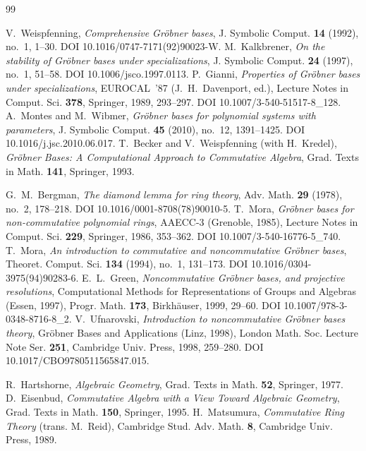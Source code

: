 \documentclass[11pt]{article}
\theoremstyle{definition}
\begin{document}
\begin{thebibliography}{99}

 V.~Weispfenning, \emph{Comprehensive Gr\"obner bases},
  J. Symbolic Comput. \textbf{14} (1992), no.~1, 1--30. DOI 10.1016/0747-7171(92)90023-W.
 M.~Kalkbrener, \emph{On the stability of Gr\"obner bases under specializations},
  J. Symbolic Comput. \textbf{24} (1997), no.~1, 51--58. DOI 10.1006/jsco.1997.0113.
 P.~Gianni, \emph{Properties of Gr\"obner bases under specializations},
  EUROCAL~'87 (J.~H.~Davenport, ed.), Lecture Notes in Comput. Sci. \textbf{378},
  Springer, 1989, 293--297. DOI 10.1007/3-540-51517-8\_128.
 A.~Montes and M.~Wibmer, \emph{Gr\"obner bases for polynomial systems with
  parameters}, J. Symbolic Comput. \textbf{45} (2010), no.~12, 1391--1425.
  DOI 10.1016/j.jsc.2010.06.017.
 T.~Becker and V.~Weispfenning (with H.~Kredel), \emph{Gr\"obner Bases:
  A Computational Approach to Commutative Algebra}, Grad. Texts in Math. \textbf{141},
  Springer, 1993.

 G.~M.~Bergman, \emph{The diamond lemma for ring theory},
  Adv. Math. \textbf{29} (1978), no.~2, 178--218. DOI 10.1016/0001-8708(78)90010-5.
 T.~Mora, \emph{Gr\"obner bases for non-commutative polynomial rings},
  AAECC-3 (Grenoble, 1985), Lecture Notes in Comput. Sci. \textbf{229}, Springer, 1986, 353--362.
  DOI 10.1007/3-540-16776-5\_740.
 T.~Mora, \emph{An introduction to commutative and noncommutative Gr\"obner bases},
  Theoret. Comput. Sci. \textbf{134} (1994), no.~1, 131--173. DOI 10.1016/0304-3975(94)90283-6.
 E.~L.~Green, \emph{Noncommutative Gr\"obner bases, and projective resolutions},
  Computational Methods for Representations of Groups and Algebras (Essen, 1997),
  Progr. Math. \textbf{173}, Birkh\"auser, 1999, 29--60. DOI 10.1007/978-3-0348-8716-8\_2.
 V.~Ufnarovski, \emph{Introduction to noncommutative Gr\"obner bases theory},
  Gr\"obner Bases and Applications (Linz, 1998), London Math. Soc. Lecture Note Ser. \textbf{251},
  Cambridge Univ. Press, 1998, 259--280. DOI 10.1017/CBO9780511565847.015.

 R.~Hartshorne, \emph{Algebraic Geometry}, Grad. Texts in Math. \textbf{52},
  Springer, 1977.
 D.~Eisenbud, \emph{Commutative Algebra with a View Toward Algebraic Geometry},
  Grad. Texts in Math. \textbf{150}, Springer, 1995.
 H.~Matsumura, \emph{Commutative Ring Theory} (trans. M.~Reid),
  Cambridge Stud. Adv. Math. \textbf{8}, Cambridge Univ. Press, 1989.


\end{thebibliography}
\end{document}

